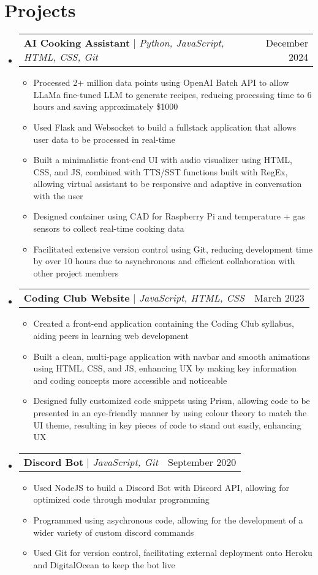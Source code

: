 \documentclass[letterpaper,11pt]{article}
\makeatletter
\newcommand{\resumeItem}[1]{
  \item\small{
    {#1 \vspace{-2pt}}
  }
}
\newcommand{\resumeProjectHeading}[2]{
    \item
    \begin{tabular*}{0.97\textwidth}{l@{\extracolsep{\fill}}r}
      \small#1 & #2 \\
    \end{tabular*}\vspace{-7pt}
}
\newcommand{\resumeSubHeadingListStart}{\begin{itemize}[leftmargin=0.15in, label={}]}
\newcommand{\resumeSubHeadingListEnd}{\end{itemize}}
\newcommand{\resumeItemListStart}{\begin{itemize}}
\newcommand{\resumeItemListEnd}{\end{itemize}\vspace{-8pt}}
\makeatother
\begin{document}
 \vspace{-13pt}



\section{Projects}
  \resumeSubHeadingListStart
    \resumeProjectHeading
        {\textbf{AI Cooking Assistant} $|$ \emph{Python, JavaScript, HTML, CSS, Git}}{December 2024}
        \resumeItemListStart
          \resumeItem{Processed 2+ million data points using OpenAI Batch API to allow LLaMa fine-tuned LLM to generate recipes, reducing processing time to 6 hours and saving approximately \$1000}
          \resumeItem{Used Flask and Websocket to build a fullstack application that allows user data to be processed in real-time}
          \resumeItem{Built a minimalistic front-end UI with audio visualizer using HTML, CSS, and JS, combined with TTS/SST functions built with RegEx, allowing virtual assistant to be responsive and adaptive in conversation with the user}
          \resumeItem{Designed container using CAD for Raspberry Pi and temperature + gas sensors to collect real-time cooking data}
          \resumeItem{Facilitated extensive version control using Git, reducing development time by over 10 hours due to asynchronous and efficient collaboration with other project members}
        \resumeItemListEnd
    \resumeProjectHeading
        {\textbf{Coding Club Website} $|$ \emph{JavaScript, HTML, CSS}}{March 2023}
        \resumeItemListStart
          \resumeItem{Created a front-end application containing the Coding Club syllabus, aiding peers in learning web development}
          \resumeItem{Built a clean, multi-page application with navbar and smooth animations using HTML, CSS, and JS, enhancing UX by making key information and coding concepts more accessible and noticeable}
          \resumeItem{Designed fully customized code snippets using Prism, allowing code to be presented in an eye-friendly manner by using colour theory to match the UI theme, resulting in key pieces of code to stand out easily, enhancing UX}
        \resumeItemListEnd
    \resumeProjectHeading
      {\textbf{Discord Bot} $|$ \emph{JavaScript, Git}}{September 2020}
      \resumeItemListStart
        \resumeItem{Used NodeJS to build a Discord Bot with Discord API, allowing for optimized code through modular programming}
        \resumeItem{Programmed using asychronous code, allowing for the development of a wider variety of custom discord commands}
        \resumeItem{Used Git for version control, facilitating external deployment onto Heroku and DigitalOcean to keep the bot live}
      \resumeItemListEnd
  \resumeSubHeadingListEnd
\end{document}
